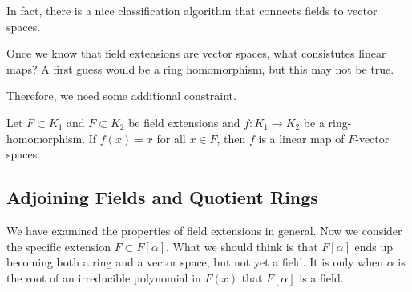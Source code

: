   In fact, there is a nice classification algorithm that connects fields to vector spaces. 

  \begin{theorem}
    
  \end{theorem}

  Once we know that field extensions are vector spaces, what consistutes linear maps? A first guess would be a ring homomorphism, but this may not be true. 

  \begin{example}
    
  \end{example}

  Therefore, we need some additional constraint. 

  \begin{theorem}
    Let $F \subset K_1$ and $F \subset K_2$ be field extensions and $f: K_1 \to K_2$ be a ring-homomorphism. If $f(x) = x$ for all $x \in F$, then $f$ is a linear map of $F$-vector spaces. 
  \end{theorem}

\subsection{Adjoining Fields and Quotient Rings} 

  We have examined the properties of field extensions in general. Now we consider the specific extension $F \subset F[\alpha]$. What we should think is that $F[\alpha]$ ends up becoming both a ring and a vector space, but not yet a field. It is only when $\alpha$ is the root of an irreducible polynomial in $F(x)$ that $F[\alpha]$ is a field.  

